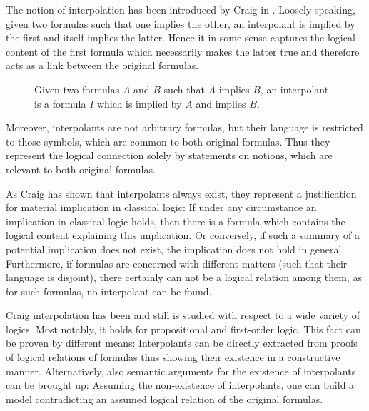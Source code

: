 

The notion of interpolation has been introduced by Craig in \cite{Craig57linear}.
Loosely speaking, given two formulas such that one implies the other, an interpolant is implied by the first and itself implies the latter.
Hence it in some sense captures the logical content of the first formula which necessarily makes the latter true and therefore acts as a link between the original formulas.


\begin{figure}[htbp]
	\centering
	\caption{Given two formulas $A$ and $B$ such that $A$ implies $B$, an interpolant is a formula $I$ which is implied by $A$ and implies $B$.}
\end{figure}


Moreover, interpolants are not arbitrary formulas, but their language is restricted to those symbols, which are common to both original formulas.
Thus they represent the logical connection solely by statements on notions, which are relevant to both original formulas.

As Craig has shown that interpolants always exist, they represent a justification for material implication in classical logic:
If under any circumstance an implication in classical logic holds, then there is a formula which contains the logical content explaining this implication.
Or conversely, if such a summary of a potential implication does not exist, the implication does not hold in general.
Furthermore, if formulas are concerned with different matters (such that their language is disjoint), there certainly can not be a logical relation among them, as for such formulas, no interpolant can be found.

Craig interpolation has been and still is studied with respect to a wide variety of logics.
Most notably, it holds for propositional and first-order logic.
This fact can be proven by different means:
Interpolants can be directly extracted from proofs of logical relations of formulas thus showing their existence in a constructive manner.
Alternatively, also semantic arguments for the existence of interpolants can be brought up:
Assuming the non-existence of interpolants, one can build a model contradicting an assumed logical relation of the original formulas.

